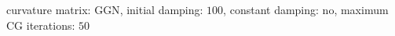 curvature matrix: $\text{GGN}$, initial damping: $\num[scientific-notation=false]{100}$, constant damping: $\text{no}$, maximum CG iterations: $\num[scientific-notation=false]{50}$